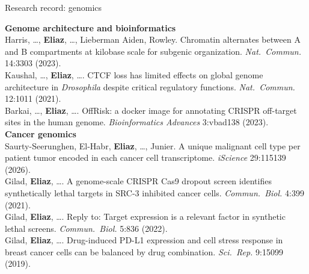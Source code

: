 \begin{frame}[t]{Research record: genomics}
\vspace{0pt}
{\fontsize{8.1}{9.8}\selectfont
\textbf{Genome architecture and bioinformatics}\\
Harris, \dots, \textbf{Eliaz}, \dots, Lieberman Aiden, Rowley. Chromatin alternates between A and B compartments at kilobase scale for subgenic organization. \emph{Nat.\ Commun.} 14:3303 (2023).\\
Kaushal, \dots, \textbf{Eliaz}, \dots. CTCF loss has limited effects on global genome architecture in \emph{Drosophila} despite critical regulatory functions. \emph{Nat.\ Commun.} 12:1011 (2021).\\
Barkai, \dots, \textbf{Eliaz}, \dots. OffRisk: a docker image for annotating CRISPR off-target sites in the human genome. \emph{Bioinformatics Advances} 3:vbad138 (2023).\\[4pt]
\textbf{Cancer genomics}\\
Saurty-Seerunghen, El-Habr, \textbf{Eliaz}, \dots, Junier. A unique malignant cell type per patient tumor encoded in each cancer cell transcriptome. \emph{iScience} 29:115139 (2026).\\
Gilad, \textbf{Eliaz}, \dots. A genome-scale CRISPR Cas9 dropout screen identifies synthetically lethal targets in SRC-3 inhibited cancer cells. \emph{Commun.\ Biol.} 4:399 (2021).\\
Gilad, \textbf{Eliaz}, \dots. Reply to: Target expression is a relevant factor in synthetic lethal screens. \emph{Commun.\ Biol.} 5:836 (2022).\\
Gilad, \textbf{Eliaz}, \dots. Drug-induced PD-L1 expression and cell stress response in breast cancer cells can be balanced by drug combination. \emph{Sci.\ Rep.} 9:15099 (2019).\par}
\end{frame}
